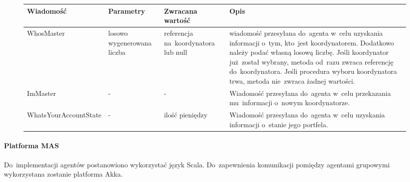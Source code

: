 \documentclass[11pt,a4paper]{article}
\begin{document}
\begin{figure}[H]
  \begin{tabularx}{\textwidth}{ |p{4cm}|p{2.5cm}|p{2.5cm}|X| }
    \hline
    \textbf{Wiadomość} & \textbf{Parametry} & \textbf{Zwracana wartość} & \textbf{Opis} \\
    \hline
    WhosMaster & losowo wygenerowana liczba & referencja na~koordynatora lub null & wiadomość przesyłana
    do~agenta w~celu uzyskania informacji o~tym, kto~jest koordynatorem. Dodatkowo należy podać własną losową liczbę. Jeśli koordynator już~został
    wybrany, metoda od~razu zwraca referencję do~koordynatora. Jeśli procedura wyboru koordynatora trwa,
    metoda nie~zwraca żadnej wartości.\\
    \hline
    ImMaster & - & - & Wiadomość przesyłana do~agenta w~celu przekazania mu~informacji o~nowym koordynatorze. \\
    \hline
    WhatsYourAccountState & - & ilość pieniędzy & Wiadomość przesyłana do~agenta w~celu uzyskania
    informacji o~stanie jego portfela.\\
    \hline
  \end{tabularx}
\end{figure}

\paragraph{Platforma MAS}
Do~implementacji agentów postanowiono wykorzystać język Scala. Do~zapewnienia komunikacji pomiędzy agentami
grupowymi wykorzystana zostanie platforma Akka.
\end{document}
